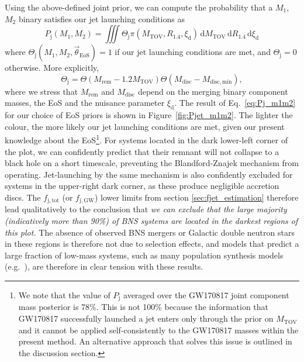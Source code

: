 \documentclass[]{aa}
\newcommand{\resp}[1]{#1}
\newcommand{\resptwo}[1]{#1}
\begin{document}
Using the \resp{above-defined joint} prior, we can compute the probability that a $M_1$, $M_2$ binary satisfies our jet launching conditions as
 \begin{equation}
  P_{\mathrm{j}}(M_1,M_2) = \iiint \Theta_\mathrm{j}\pi(M_\mathrm{TOV},R_{1.4},\xi_\mathrm{d})\,\mathrm{d}M_\mathrm{TOV}\,\mathrm{d}R_{1.4}\,\mathrm{d}\xi_\mathrm{d}
  \label{eq:Pj_m1m2}
 \end{equation}
where $\Theta_\mathrm{j}(M_1,M_2,\vec\theta_\mathrm{EoS})=1$ if our jet launching conditions are met, and $\Theta_\mathrm{j}=0$ otherwise. More explicitly, 
\begin{equation}
 \Theta_\mathrm{j}=\Theta(M_\mathrm{rem}-1.2M_\mathrm{TOV})\Theta(M_\mathrm{disc}-M_\mathrm{disc,min}),
 \label{eq:Theta_j}
\end{equation}
\resp{where} we stress that $M_\mathrm{rem}$ and $M_\mathrm{disc}$ depend on the merging binary component masses, the EoS \resp{and the nuisance parameter $\xi_\mathrm{d}$}. The result of Eq.~\ref{eq:Pj_m1m2} for our choice of EoS priors is shown in Figure~\ref{fig:Pjet_m1m2}. The lighter the colour, the more likely our jet launching conditions are met, given our present knowledge about the EoS\footnote{\resptwo{We note that the value of $P_\mathrm{j}$ averaged over the GW170817 joint component mass posterior \citep[adopting the low-spin-prior samples from][]{Abbott2019_GW170817_properties} is 78\%. This is not 100\% because the information that GW170817 successfully launched a jet enters only through the prior on $M_\mathrm{TOV}$ and it cannot be applied self-consistently to the GW170817 masses within the present method. An alternative approach that solves this issue is outlined in the discussion section.}}. For systems located in the dark lower-left corner of the plot, we can confidently predict that their remnant will not collapse to a black hole on a short timescale, preventing the Blandford-Znajek mechanism from operating. \resp{Jet-launching by the same mechanism is also confidently excluded for systems in the upper-right dark corner, as these produce negligible accretion discs.} The $f_\mathrm{j,tot}$ (or $f_\mathrm{j,GW}$) lower limits from section \ref{sec:fjet_estimation} therefore lead qualitatively to the conclusion that \textit{we can exclude that the large majority \resp{(indicatively more than 90\%)} of BNS systems are located in the darkest regions of this plot.} The absence of observed BNS mergers or Galactic double neutron stars in these regions is therefore not due to selection effects, and models that predict a large fraction of low-mass systems, such as many population synthesis models (e.g.~\citealt{Fryer2012,Dominik2012,VignaGomez2018,Mapelli2018}), are therefore in clear tension with these results.
\end{document}
